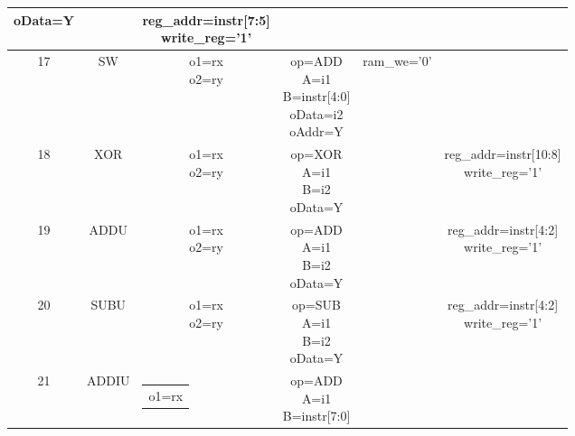 \documentclass[10pt]{article}
\makeatletter
\newcommand{\zcell}[2]{\begin{tabular}{@{}#1@{}}#2\end{tabular}}
\makeatother
\begin{document}
\begin{center}
\begin{longtable}{|c|c|c|c|c|c|}
{								   oData=Y}           &                         &\zcell{c}{
																				 reg\_addr=instr[7:5]\\
														                         write\_reg='1'}\\\hline
17 & SW        &\zcell{c}{o1=rx\\                                        
                o2=ry}            &\zcell{c}{op=ADD\\
								   A=i1\\
								   B=instr[4:0]\\
								   oData=i2\\
								   oAddr=Y}           &ram\_we='0'              &    \\\hline
18 & XOR       &\zcell{c}{o1=rx\\                                        
                o2=ry}            &\zcell{c}{op=XOR\\
								   A=i1\\B=i2\\
								   oData=Y}           &                         &\zcell{c}{
																				 reg\_addr=instr[10:8]\\
														                         write\_reg='1'}\\\hline
19 & ADDU      &\zcell{c}{o1=rx\\                                                            
                o2=ry}            &\zcell{c}{op=ADD\\
								   A=i1\\B=i2\\
								   oData=Y}           &                         &\zcell{c}{
																				 reg\_addr=instr[4:2]\\
														                         write\_reg='1'}\\\hline
20 & SUBU      &\zcell{c}{o1=rx\\                                                            
                o2=ry}            &\zcell{c}{op=SUB\\
								   A=i1\\B=i2\\
								   oData=Y}           &                         &\zcell{c}{
																				 reg\_addr=instr[4:2]\\
														                         write\_reg='1'}\\\hline
21 & ADDIU     &\zcell{c}{o1=rx}  &\zcell{c}{op=ADD\\
								   A=i1\\B=instr[7:0]\\
}
\end{longtable}
\end{center}
\end{document}
